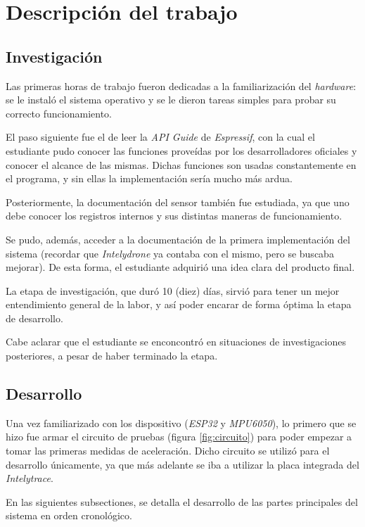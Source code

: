 \documentclass{article}
\begin{document}

    \newpage
    \section{Descripción del trabajo}   

    \subsection{Investigación}
    Las primeras horas de trabajo fueron dedicadas a la familiarización del 
    \emph{hardware}: se le instaló el sistema operativo y se le dieron tareas
    simples para probar su correcto funcionamiento. \par
    El paso siguiente fue el de leer la \emph{API Guide} de \emph{Espressif}, 
    con la cual el estudiante pudo conocer las funciones proveídas por los 
    desarrolladores oficiales y conocer el alcance de las mismas. Dichas 
    funciones son usadas constantemente en el programa, y sin ellas la 
    implementación sería mucho más ardua. \par
    Posteriormente, la documentación del sensor también fue estudiada, ya que 
    uno debe conocer los registros internos y sus distintas maneras de 
    funcionamiento. \par
    Se pudo, además, acceder a la documentación de la primera implementación
    del sistema (recordar que \emph{Intelydrone} ya contaba con el mismo, pero 
    se buscaba mejorar). De esta forma, el estudiante adquirió una idea clara 
    del producto final. \newline \par

    La etapa de investigación, que duró 10 (diez) días, sirvió para tener un 
    mejor entendimiento general de la labor, y así poder encarar de forma 
    óptima la etapa de desarrollo. \par
    Cabe aclarar que el estudiante se enconcontró en situaciones de 
    investigaciones posteriores, a pesar de haber terminado la etapa.

    \subsection{Desarrollo}
    Una vez familiarizado con los dispositivo (\emph{ESP32} y \emph{MPU6050}),
    lo primero que se hizo fue armar el circuito de pruebas (figura 
    \ref{fig:circuito}) para poder empezar a tomar las primeras medidas de 
    aceleración. Dicho circuito se utilizó para el desarrollo únicamente, ya 
    que más adelante se iba a utilizar la placa integrada del \emph{Intelytrace}.
    \par
    En las siguientes subsectiones, se detalla el desarrollo de las partes 
    principales del sistema en orden cronológico.
\end{document}
